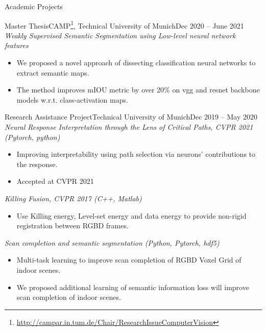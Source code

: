 \documentclass[]{mcdowellcv}
\begin{document}
    \newpage  %
    
    \begin{cvsection}{Academic Projects}
    \begin{cvsubsection}[2]{Master Thesis}{CAMP\footnote{\href{http://campar.in.tum.de/Chair/ResearchIssueComputerVision}{http://campar.in.tum.de/Chair/ResearchIssueComputerVision}}, Technical University of Munich}{Dec 2020 -- June 2021}
    \textit{Weakly Supervised Semantic Segmentation using Low-level neural network features}
        \begin{itemize}
            \item We proposed a novel approach of dissecting classification neural networks to extract semantic maps.
            \item The method improves mIOU metric by over 20\% on vgg and resnet backbone models w.r.t. class-activation maps.
        \end{itemize}
    \end{cvsubsection}
    
    \begin{cvsubsection}{Research Assistance Project}{Technical University of Munich}{Dec 2019 -- May 2020}
    \textit{Neural Response Interpretation through the Lens of Critical Paths, CVPR 2021 (Pytorch, python) \cite{khakzar-2021}}
        \begin{itemize}
        \item Improving interpretability using path selection via
neurons’ contributions to the response.
        \item Accepted at CVPR 2021
        \end{itemize}
    \textit{Killing Fusion, CVPR 2017 (C++, Matlab) \cite{slavcheva2017killingfusion}}
        \begin{itemize}
        \item Use Killing energy, Level-set energy and data energy to provide non-rigid registration between RGBD frames.
        \end{itemize}
    \textit{Scan completion and semantic segmentation (Python, Pytorch, hdf5)}
        \begin{itemize}
        \item Multi-task learning to improve scan completion of RGBD Voxel Grid of indoor scenes.
        \item We proposed additional learning of semantic information loss will improve scan completion of indoor scenes.
        \end{itemize}
    \end{cvsubsection}
    

\end{cvsection}
\end{document}
